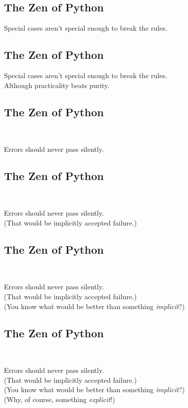 \documentclass[xga]{xdvislides}
\begin{document}
\subsection{The Zen of Python}
\begin{center}
    Special cases aren't special enough to break the rules.
\end{center}

\subsection{The Zen of Python}
\begin{center}
    Special cases aren't special enough to break the rules. \\
\addvspace{.5in}
    Although practicality beats purity.
\end{center}

\subsection{The Zen of Python}
\\
\begin{center}
    Errors should never pass silently.
\end{center}

\subsection{The Zen of Python}
\\
\begin{center}
    Errors should never pass silently. \\
\addvspace{.2in}
	\small
	(That would be implicitly accepted failure.)
\end{center}
\Huge

\subsection{The Zen of Python}
\\
\begin{center}
    Errors should never pass silently. \\
\addvspace{.2in}
	\small
	(That would be implicitly accepted failure.) \\
\addvspace{.2in}
	(You know what would be better than something {\em implicit}?)
\end{center}

\subsection{The Zen of Python}
\\
\begin{center}
    Errors should never pass silently. \\
\addvspace{.2in}
	\small
	(That would be implicitly accepted failure.) \\
\addvspace{.2in}
	(You know what would be better than something {\em implicit}?) \\
\addvspace{.2in}
	(Why, of course, something {\em explicit}!)
\end{center}
\end{document}
